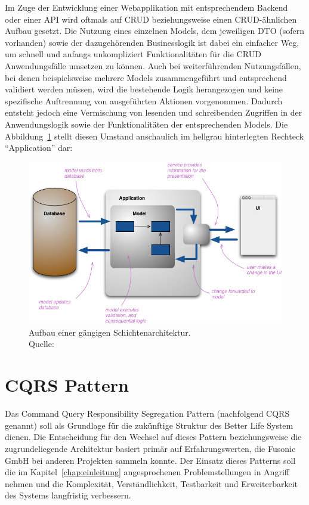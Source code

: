 \documentclass[a4paper,12pt,twoside]{scrreprt}
\begin{document}
\smallskip

Im Zuge der Entwicklung einer Webapplikation mit entsprechendem Backend oder einer API wird oftmals auf CRUD beziehungsweise einen CRUD-ähnlichen Aufbau gesetzt. Die Nutzung eines einzelnen Models, dem jeweiligen DTO (sofern vorhanden) sowie der dazugehörenden Businesslogik ist dabei ein einfacher Weg, um schnell und anfangs unkompliziert Funktionalitäten für die CRUD Anwendungsfälle umsetzen zu können. Auch bei weiterführenden Nutzungsfällen, bei denen beispielsweise mehrere Models zusammengeführt und entsprechend validiert werden müssen, wird die bestehende Logik herangezogen und keine spezifische Auftrennung von ausgeführten Aktionen vorgenommen. Dadurch entsteht jedoch eine Vermischung von lesenden und schreibenden Zugriffen in der Anwendungslogik sowie der Funktionalitäten der entsprechenden Models. \parencite[][]{fowler_cqrs_2011} Die Abbildung~\ref{fig:single-model-fowler} stellt diesen Umstand anschaulich im hellgrau hinterlegten Rechteck \enquote{Application} dar:

\begin{figure}[ht]
    \centering
    \includegraphics[scale=0.55]{images/fowler_single_model.png}
    \caption[Aufbau einer gängigen Schichtenarchitektur]{Aufbau einer gängigen Schichtenarchitektur.\\Quelle: \cite{fowler_cqrs_2011}}
    \label{fig:single-model-fowler}
\end{figure}

\section{CQRS Pattern}
\label{sec:cqrs-pattern}
Das Command Query Responsibility Segregation Pattern (nachfolgend CQRS genannt) soll als Grundlage für die zukünftige Struktur des Better Life System dienen. Die Entscheidung für den Wechsel auf dieses Pattern beziehungsweise die zugrundeliegende Architektur basiert primär auf Erfahrungswerten, die Fusonic GmbH bei anderen Projekten sammeln konnte. Der Einsatz dieses Patterns soll die im Kapitel~\ref{chap:einleitung} angesprochenen Problemstellungen in Angriff nehmen und die Komplexität, Verständlichkeit, Testbarkeit und Erweiterbarkeit des Systems langfristig verbessern.
\end{document}
